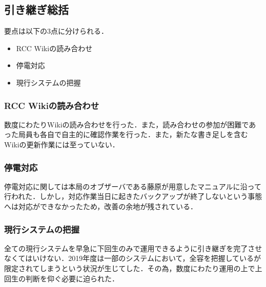 \subsection*{引き継ぎ総括}


要点は以下の3点に分けられる．
 \begin{itemize}
\item RCC Wikiの読み合わせ
\item 停電対応
\item 現行システムの把握
 \end{itemize}
\subsubsection* {RCC Wikiの読み合わせ}
数度にわたりWikiの読み合わせを行った．また，読み合わせの参加が困難であった局員も各自で自主的に確認作業を行った．また，新たな書き足しを含むWikiの更新作業には至っていない．
\subsubsection* {停電対応}
停電対応に関しては本局のオブザーバである藤原が用意したマニュアルに沿って行われた．しかし，対応作業当日に起きたバックアップが終了しないという事態へは対応ができなかったため，改善の余地が残されている．
\subsubsection* {現行システムの把握}
全ての現行システムを早急に下回生のみで運用できるように引き継ぎを完了させなくてはいけない．2019年度は一部のシステムにおいて，全容を把握している\systemStaff{}が限定されてしまうという状況が生じてした．その為，数度にわたり運用の上で上回生の判断を仰ぐ必要に迫られた．